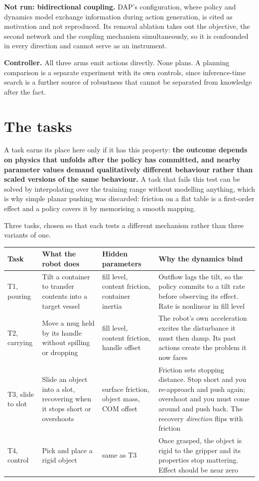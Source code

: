 \documentclass[9pt]{extarticle}
\begin{document}
\textbf{Not run: bidirectional coupling.} DAP's configuration, where policy and dynamics model exchange information during action generation, is cited as motivation and not reproduced. Its removal ablation takes out the objective, the second network and the coupling mechanism simultaneously, so it is confounded in every direction and cannot serve as an instrument.

\textbf{Controller.} All three arms emit actions directly. None plans. A planning comparison is a separate experiment with its own controls, since inference-time search is a further source of robustness that cannot be separated from knowledge after the fact.

\section{The tasks}

A task earns its place here only if it has this property: \textbf{the outcome depends on physics that unfolds after the policy has committed, and nearby parameter values demand qualitatively different behaviour rather than scaled versions of the same behaviour.} A task that fails this test can be solved by interpolating over the training range without modelling anything, which is why simple planar pushing was discarded: friction on a flat table is a first-order effect and a policy covers it by memorising a smooth mapping.

Three tasks, chosen so that each tests a different mechanism rather than three variants of one.

\begin{tabular}{@{}p{2.5cm} p{4.6cm} p{4.0cm} p{5.0cm}@{}}
\toprule
Task & What the robot does & Hidden parameters & Why the dynamics bind \\
\midrule
T1, pouring & Tilt a container to transfer contents into a target vessel & fill level, content friction, container inertia & Outflow lags the tilt, so the policy commits to a tilt rate before observing its effect. Rate is nonlinear in fill level \\
T2, carrying & Move a mug held by its handle without spilling or dropping & fill level, content friction, handle offset & The robot's own acceleration excites the disturbance it must then damp. Its past actions create the problem it now faces \\
T3, slide to slot & Slide an object into a slot, recovering when it stops short or overshoots & surface friction, object mass, COM offset & Friction sets stopping distance. Stop short and you re-approach and push again; overshoot and you must come around and push back. The recovery \emph{direction} flips with friction \\
\midrule
T4, control & Pick and place a rigid object & same as T3 & Once grasped, the object is rigid to the gripper and its properties stop mattering. Effect should be near zero \\
\bottomrule
\end{tabular}
\end{document}
